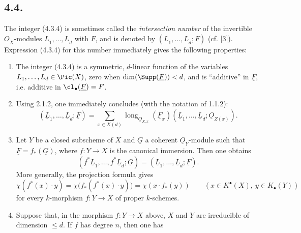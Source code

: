 %

\subsection*{4.4.}
The integer (4.3.4) is sometimes called the \emph{intersection number} of the invertible \(\underline{O}_X\)-modules \(\underline{L}_1,\ldots,\underline{L}_d\) with \(\underline{F}\), and is denoted by \((\underline{L}_1,\ldots,\underline{L}_d;\underline{F})\) (cf. [3]). Expression (4.3.4) for this number immediately gives the following properties:

\begin{enumerate}[label=\arabic*)]
\item The integer (4.3.4) is a symmetric, \(d\)-linear function of the variables \(L_1,\ldots,L_d\in\Pic(X)\), zero when \(\dim(\Supp(\underline{F}))<d\), and is ``additive'' in \(\underline{F}\), i.e. additive in \(\cl_\bullet(\underline F)=F\).

\item Using 2.1.2, one immediately concludes (with the notation of 1.1.2):
\begin{equation}\tag{4.4.1}
 (\underline{L}_1,\ldots,\underline{L}_d;\underline{F})
 =
 \sum_{x\in X(d)}
 \operatorname{long}_{\underline{O}_{X,x}}(\underline{F}_x)
 (\underline{L}_1,\ldots,\underline{L}_d;\underline{O}_{Z(x)}).
\end{equation}

\item Let \(Y\) be a closed subscheme of \(X\) and \(\underline{G}\) a coherent \(\underline{O}_Y\)-module such that \(\underline{F}=f_*(\underline{G})\), where \(f:Y\to X\) is the canonical immersion. Then one obtains
\[
 (f^*\underline{L}_1,\ldots,f^*\underline{L}_d;\underline{G})=(\underline{L}_1,\ldots,\underline{L}_d;\underline{F}).
\]
More generally, the projection formula gives
\begin{equation}\tag{4.4.2}
 \chi(f^*(x)\cdot y)=\chi\bigl(f_*(f^*(x)\cdot y)\bigr)=\chi(x\cdot f_*(y))
 \qquad (x\in K^{\bullet}(X),\ y\in K_\bullet(Y))
\end{equation}
for every \(k\)-morphism \(f:Y\to X\) of proper \(k\)-schemes.

\item Suppose that, in the morphism \(f:Y\to X\) above, \(X\) and \(Y\) are irreducible of dimension \(\leq d\). If \(f\) has degree \(n\), then one has



\end{enumerate}
